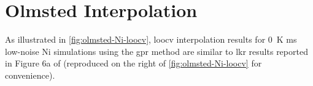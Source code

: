 \documentclass[preprint,12pt]{elsarticle}
\begin{document}
	
	\section{Olmsted Interpolation}
	
	As illustrated in \cref{fig:olmsted-Ni-loocv}, \gls{loocv} interpolation results for \SI{0}{\kelvin} \gls{ms} low-noise Ni simulations using the \gls{gpr} method are similar to \gls{lkr} results reported in Figure 6a of \citet{chesserLearningGrainBoundary2020} (reproduced on the right of \cref{fig:olmsted-Ni-loocv} for convenience).
	
\end{document}
